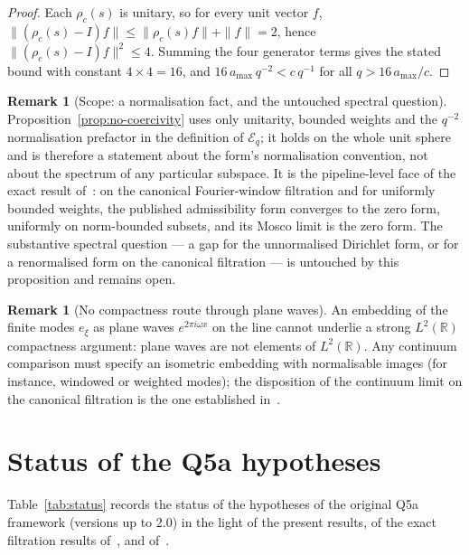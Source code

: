 \documentclass[11pt,a4paper]{article}
\theoremstyle{plain}
\theoremstyle{definition}
\newtheorem{remark}[theorem]{Remark}
\newcommand{\R}{\mathbb{R}}
\newcommand{\Eq}{\mathcal{E}_q}
\newcommand{\exi}[1]{e_{#1}}
\begin{document}
  \begin{proof}
    Each $\rho_c(s)$ is unitary, so for every unit vector $f$,
    $\|(\rho_c(s) - I)f\| \le \|\rho_c(s)f\| + \|f\| = 2$, hence
    $\|(\rho_c(s) - I)f\|^2 \le 4$.
    Summing the four generator terms gives the stated bound with constant
    $4 \times 4 = 16$, and $16\,a_{\max}\,q^{-2} < c\,q^{-1}$ for all
    $q > 16\,a_{\max}/c$.
  \end{proof}

  \begin{remark}[Scope: a normalisation fact, and the untouched spectral question]
    \label{rem:zero-form}
    Proposition~\ref{prop:no-coercivity} uses only unitarity, bounded weights and the $q^{-2}$
    normalisation prefactor in the definition of $\Eq$; it holds on the whole unit
    sphere and is therefore a statement about the form's normalisation convention, not
    about the spectrum of any particular subspace.
    It is the pipeline-level face of the exact result of~\cite{Beau2026q5a}: on the
    canonical Fourier-window filtration and for uniformly bounded weights, the published
    admissibility form converges to the zero form, uniformly on norm-bounded subsets, and its Mosco limit is the zero
    form.
    The substantive spectral question --- a gap for the unnormalised Dirichlet form, or
    for a renormalised form on the canonical filtration --- is untouched by this
    proposition and remains open.
  \end{remark}

  \begin{remark}[No compactness route through plane waves]
    \label{rem:no-plane-waves}
    An embedding of the finite modes $\exi{\xi}$ as plane waves
    $e^{2\pi i \omega x}$ on the line cannot underlie a strong $L^2(\R)$ compactness
    argument: plane waves are not elements of $L^2(\R)$.
    Any continuum comparison must specify an isometric embedding with normalisable
    images (for instance, windowed or weighted modes); the disposition of the continuum
    limit on the canonical filtration is the one established in~\cite{Beau2026q5a}.
  \end{remark}

  \section{Status of the Q5a hypotheses}
  \label{sec:update}

  Table~\ref{tab:status} records the status of the hypotheses of the original Q5a
  framework (versions up to 2.0) in the light of the present results, of the exact filtration
  results
  of~\cite{Beau2026q5a}, and of~\cite{Beau2026w1,Beau2026h2}.
\end{document}
